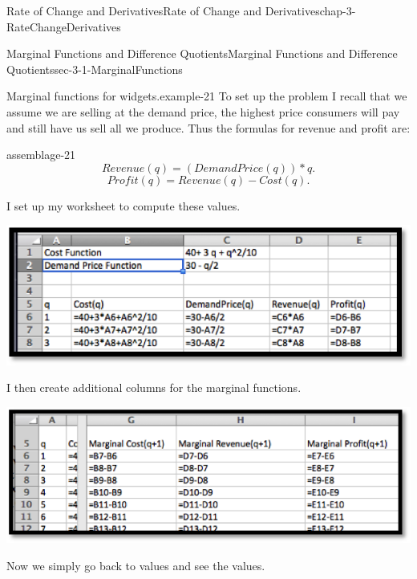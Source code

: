 \documentclass[oneside,10pt,]{book}
\numberwithin{equation}{section}
\begin{document}
\begin{chapterptx}{Rate of Change and Derivatives}{}{Rate of Change and Derivatives}{}{}{chap-3-RateChangeDerivatives}
\begin{sectionptx}{Marginal Functions and Difference Quotients}{}{Marginal Functions and Difference Quotients}{}{}{sec-3-1-MarginalFunctions}
\begin{example}{Marginal functions for widgets.}{example-21}
\hypertarget{p-910}{}%
To set up the problem I recall that we assume we are selling at the demand price, the highest price consumers will pay and still have us sell all we produce.  Thus the formulas for revenue and profit are:%
\begin{assemblage}{}{assemblage-21}%
\hypertarget{p-911}{}%
%
\begin{equation*}
Revenue(q)=(Demand Price(q))*q.
\end{equation*}
%
\begin{equation*}
Profit(q)=Revenue(q)-Cost(q).
\end{equation*}
%
\end{assemblage}
\hypertarget{p-912}{}%
I set up my worksheet to compute these values.%
\begin{sidebyside}{1}{0.15}{0.15}{0}%
\begin{sbspanel}{0.7}%
\includegraphics[width=1\linewidth]{images/sec3-1-1.png}
\end{sbspanel}%
\end{sidebyside}%
\par
\hypertarget{p-913}{}%
I then create additional columns for the marginal functions.%
\begin{sidebyside}{1}{0.15}{0.15}{0}%
\begin{sbspanel}{0.7}%
\includegraphics[width=1\linewidth]{images/sec3-1-2.png}
\end{sbspanel}%
\end{sidebyside}%
\par
\hypertarget{p-914}{}%
Now we simply go back to values and see the values.%
\begin{sidebyside}{1}{0.15}{0.15}{0}%

\end{sidebyside}
\end{example}
\end{sectionptx}
\end{chapterptx}
\end{document}
